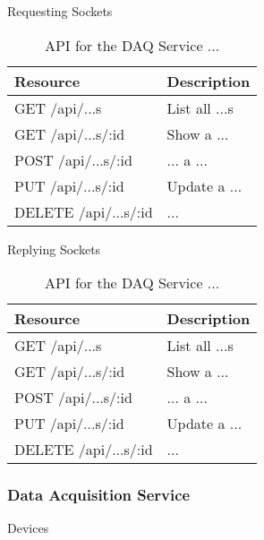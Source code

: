       \large{Requesting Sockets}

      \begin{table}[H]
        \centering
        \begin{tabular}{p{6cm} p{10cm}}
          \toprule
          \textbf{Resource} & \textbf{Description} \\ [0.5ex]
          \midrule
          GET /api/...s & List all ...s \\
          GET /api/...s/:id & Show a ... \\
          POST /api/...s/:id & ... a ... \\
          PUT /api/...s/:id & Update a ... \\
          DELETE /api/...s/:id & ... \\
          \bottomrule
        \end{tabular}
        \caption{API for the DAQ Service ...}\label{tab:rest-daq-...}
      \end{table}

      \large{Replying Sockets}

      \begin{table}[H]
        \centering
        \begin{tabular}{p{6cm} p{10cm}}
          \toprule
          \textbf{Resource} & \textbf{Description} \\ [0.5ex]
          \midrule
          GET /api/...s & List all ...s \\
          GET /api/...s/:id & Show a ... \\
          POST /api/...s/:id & ... a ... \\
          PUT /api/...s/:id & Update a ... \\
          DELETE /api/...s/:id & ... \\
          \bottomrule
        \end{tabular}
        \caption{API for the DAQ Service ...}\label{tab:rest-daq-...}
      \end{table}

    \subsubsection{Data Acquisition Service}\label{sec:rest-daq}

      \large{Devices}

